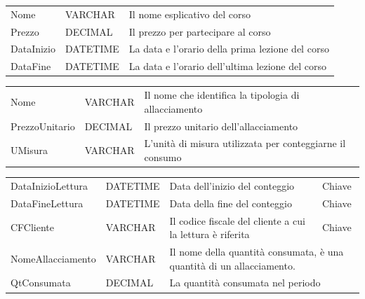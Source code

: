 \begin{center}
    \begin{tabularx}{\textwidth}{|l|l|X|}
        \hline
        \rowcolor{gray!30}
        \multicolumn{3}{|c|}{\textbf{Sosta}}\\
        \hline
        Nome & VARCHAR & Il nome esplicativo del corso \\
        \hline
        Prezzo & DECIMAL & Il prezzo per partecipare al corso\\
        \hline
        DataInizio & DATETIME & La data e l'orario della prima lezione del corso\\
        \hline
        DataFine & DATETIME & La data e l'orario dell'ultima lezione del corso\\
        \hline
    \end{tabularx}
\end{center}

\begin{center}
    \begin{tabularx}{\textwidth}{|l|l|X|}
        \hline
        \rowcolor{gray!30}
        \multicolumn{3}{|c|}{\textbf{Allacciamento}}\\
        \hline
        Nome & VARCHAR & Il nome che identifica la tipologia di allacciamento\\
        \hline
        PrezzoUnitario & DECIMAL & Il prezzo unitario dell'allacciamento\\
        \hline
        UMisura & VARCHAR & L'unità di misura utilizzata per conteggiarne il consumo\\
        \hline
    \end{tabularx}
\end{center}

\begin{center}
    \begin{tabularx}{\textwidth}{|l|l|l|X|}
        \hline
        \rowcolor{gray!30}
        \multicolumn{4}{|c|}{\textbf{Oraro di apertura}}\\
        \hline
        DataInizioLettura & DATETIME & Data dell'inizio del conteggio & Chiave \\
        \hline
        DataFineLettura & DATETIME & Data della fine del conteggio & Chiave \\
        \hline
        CFCliente & VARCHAR & Il codice fiscale del cliente a cui la lettura è riferita & Chiave \\
        \hline
        NomeAllacciamento & VARCHAR & \multicolumn{2}{l|}{Il nome della quantità consumata, è una quantità di un allacciamento.} \\
        \hline
        QtConsumata & DECIMAL & \multicolumn{2}{l|}{La quantità consumata nel periodo} \\
        \hline
    \end{tabularx}
\end{center}

